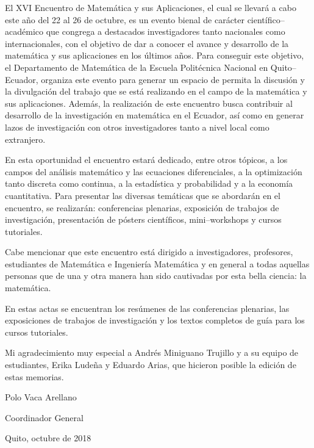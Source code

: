 \documentclass[a5paper,doc,10pt,noapacite]{apa6}
\newcommand{\EPN}{Escuela Politécnica Nacional}
\begin{document}
{El XVI Encuentro de Matemática y sus Aplicaciones, el cual se llevará a cabo este año del 22 al 26 de octubre, es un evento bienal de carácter científico--académico que congrega a destacados investigadores tanto nacionales como internacionales, con el objetivo de dar a conocer el avance y desarrollo de la matemática y sus aplicaciones en los últimos años. Para conseguir este objetivo, el Departamento de Matemática de la {\EPN} en Quito--Ecuador, organiza este evento para generar un espacio de permita la discusión y la divulgación del trabajo que se está realizando en el campo de la matemática y sus aplicaciones. Además, la realización de este encuentro busca contribuir al desarrollo de la investigación en matemática en el Ecuador, así como en generar lazos de investigación con otros investigadores tanto a nivel local como extranjero. 

\vspace{0.5\baselineskip}
En esta oportunidad el encuentro estará dedicado, entre otros tópicos, a los campos del análisis matemático y las ecuaciones diferenciales, a la optimización tanto discreta como continua, a la estadística y probabilidad y a la economía cuantitativa. Para presentar las diversas temáticas que se abordarán en el encuentro, se realizarán: conferencias plenarias, exposición de trabajos de investigación, presentación de pósters científicos, mini--workshops y cursos tutoriales.

\vspace{0.5\baselineskip}
Cabe mencionar que este encuentro está dirigido a investigadores, profesores, estudiantes de Matemática e Ingeniería Matemática y en general a todas aquellas personas que de una y otra manera han sido cautivadas por esta bella ciencia: la matemática.

\vspace{0.5\baselineskip}
En estas actas se encuentran los resúmenes de las conferencias plenarias, las exposiciones de trabajos de investigación y los textos completos de guía para los cursos tutoriales.

\vspace{0.5\baselineskip}
Mi agradecimiento muy especial a Andrés Miniguano Trujillo y a su equipo de estudiantes, Erika Ludeña y Eduardo Arias, que hicieron posible la edición de estas memorias.


\vspace{2\baselineskip}
Polo Vaca Arellano

Coordinador General

\vspace{0.5\baselineskip}
Quito, octubre de 2018



}
\end{document}
